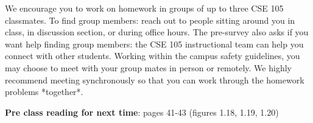 We encourage you to work on homework in groups of up to three CSE 105 classmates. 
To find group members: reach out to people sitting around you in class, in discussion section, 
or during office hours. The pre-survey also asks if you want help finding group members: 
the CSE 105 instructional team can help you connect with other students. Working within the 
campus safety guidelines, you may choose to meet with your group mates in person or remotely. 
We highly recommend meeting synchronously so that you can work through the homework problems *together*. 

{\bf Pre class reading for next time}: pages 41-43 (figures 1.18, 1.19, 1.20)


